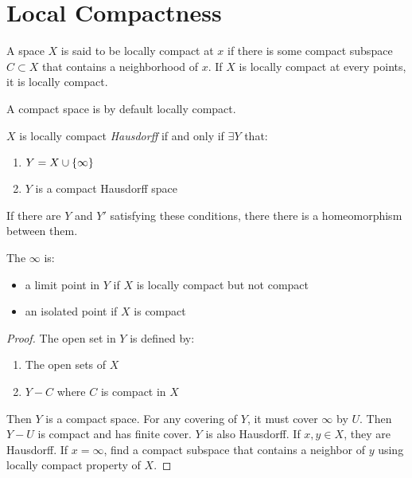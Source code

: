 \section{Local Compactness}

\begin{definition}
    A space $X$ is said to be locally compact at $x$ if there is some compact subspace $C \subset X$ that contains a neighborhood of $x$. If $X$ is locally compact at every points, it is locally compact.
    
    A compact space is by default locally compact.
\end{definition}


\begin{theorem}
    $X$ is locally compact \emph{Hausdorff} if and only if $\exists Y$ that:
    \begin{enumerate}
        \item $Y = X \cup \set{\infty}$
        \item $Y$ is a compact Hausdorff space
    \end{enumerate}
    
    If there are $Y$ and $Y'$ satisfying these conditions, there there is a homeomorphism between them. 
    
    
    The $\infty$ is:
    \begin{itemize}
        \item a limit point in $Y$ if $X$ is locally compact but not compact
        \item an isolated point if $X$ is compact
    \end{itemize}
    
     
\end{theorem}
\begin{proof}
    The open set in $Y$ is defined by:
    \begin{enumerate}
        \item The open sets of $X$
        \item $Y -C$ where $C$ is compact in $X$
    \end{enumerate}
    
    Then $Y$ is a compact space. For any covering of $Y$, it must cover $\infty$ by $U$. Then $Y-U$ is compact and has finite cover. $Y$ is also Hausdorff. If $x,y \in X$, they are Hausdorff. If $x =\infty$, find a compact subspace that contains a neighbor of $y$ using locally compact property of $X$.
\end{proof}

